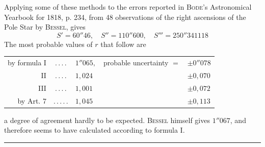 Applying some of these methods to the errors reported in \textsc{Bode}'s Astronomical Yearbook for 1818, p. 234, from 48 observations of the right ascensions of the Pole Star by \textsc{Bessel}, gives
\[
S'=60''46,\quad S''=110''600,\quad S'''=250''341118
\]
The most probable values of \(r\) that follow are
\begin{center}
\begin{tabular}{r@{\;}c@{\;}l@{\quad}l@{\;}l}
by formula I&.\,.\,.\,.&\(1''065,\)&probable uncertainty \(=\)&\(\pm0''078\)\\
II&.\,.\,.\,.&\(1{,}024\)&&\(\pm0{,}070\)\\
III&.\,.\,.\,.&\(1{,}001\)&&\(\pm0{,}072\)\\
by Art. 7&.\,.\,.\,.\,.&\(1{,}045\)&&\(\pm0{,}113\)
\end{tabular}
\end{center}
a degree of agreement hardly to be expected. \textsc{Bessel} himself gives \(1''067\), and therefore seems to have calculated according to formula I.
\begin{center}\rule{.24\linewidth}{.3pt}\end{center}
